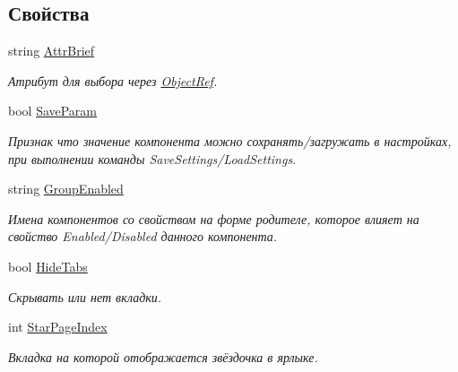 \subsection*{Свойства}
\begin{DoxyCompactItemize}
\item 
string \mbox{\hyperlink{class_f_b_a_1_1_tab_control_f_b_a_af603a870b359f259a5d0fba24f3bb3e2}{Attr\+Brief}}
\begin{DoxyCompactList}\small\item\em Атрибут для выбора через \mbox{\hyperlink{class_f_b_a_1_1_object_ref}{Object\+Ref}}. \end{DoxyCompactList}\item 
bool \mbox{\hyperlink{class_f_b_a_1_1_tab_control_f_b_a_aefd1e772b935f2fcc1c752f40e2972d9}{Save\+Param}}
\begin{DoxyCompactList}\small\item\em Признак что значение компонента можно сохранять/загружать в настройках, при выполнении команды Save\+Settings/\+Load\+Settings. \end{DoxyCompactList}\item 
string \mbox{\hyperlink{class_f_b_a_1_1_tab_control_f_b_a_a5e066f394c35e687e0959f35f7784dd5}{Group\+Enabled}}
\begin{DoxyCompactList}\small\item\em Имена компонентов со свойством на форме родителе, которое влияет на свойство Enabled/\+Disabled данного компонента. \end{DoxyCompactList}\item 
bool \mbox{\hyperlink{class_f_b_a_1_1_tab_control_f_b_a_a5ac313dd054fab722c266e8a62f90833}{Hide\+Tabs}}
\begin{DoxyCompactList}\small\item\em Скрывать или нет вкладки. \end{DoxyCompactList}\item 
int \mbox{\hyperlink{class_f_b_a_1_1_tab_control_f_b_a_ad8f282f234893bd25c48f8cb0f2bafd1}{Star\+Page\+Index}}
\begin{DoxyCompactList}\small\item\em Вкладка на которой отображается звёздочка в ярлыке. \end{DoxyCompactList}\item 

\end{DoxyCompactItemize}
